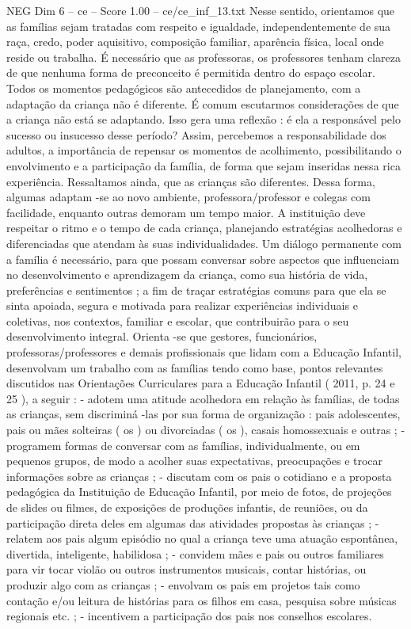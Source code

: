 \begin{textsample}{NEG Dim 6 – ce – Score 1.00 – ce/ce\_inf\_13.txt}
Nesse sentido, orientamos que as famílias sejam tratadas com respeito e igualdade, independentemente de sua raça, credo, poder aquisitivo, composição familiar, aparência física, local onde reside ou trabalha.
É necessário que as professoras, os professores tenham clareza de que nenhuma forma de preconceito é permitida dentro do espaço escolar.
Todos os momentos pedagógicos são antecedidos de planejamento, com a adaptação da criança não é diferente.
É comum escutarmos considerações de que a criança não está se adaptando.
Isso gera uma reflexão : é ela a responsável pelo sucesso ou insucesso desse período?
Assim, percebemos a responsabilidade dos adultos, a importância de repensar os momentos de acolhimento, possibilitando o envolvimento e a participação da família, de forma que sejam inseridas nessa rica experiência.
Ressaltamos ainda, que as crianças são diferentes.
Dessa forma, algumas adaptam -se ao novo ambiente, professora/professor e colegas com facilidade, enquanto outras demoram um tempo maior.
A instituição deve respeitar o ritmo e o tempo de cada criança, planejando estratégias acolhedoras e diferenciadas que atendam às suas individualidades.
Um diálogo permanente com a família é necessário, para que possam conversar sobre aspectos que influenciam no desenvolvimento e aprendizagem da criança, como sua história de vida, preferências e sentimentos ; a fim de traçar estratégias comuns para que ela se sinta apoiada, segura e motivada para realizar experiências individuais e coletivas, nos contextos, familiar e escolar, que contribuirão para o seu desenvolvimento integral.
Orienta -se que gestores, funcionários, professoras/professores e demais profissionais que lidam com a Educação Infantil, desenvolvam um trabalho com as famílias tendo como base, pontos relevantes discutidos nas Orientações Curriculares para a Educação Infantil ( 2011, p. 24 e 25 ), a seguir : - adotem uma atitude acolhedora em relação às famílias, de todas as crianças, sem discriminá -las por sua forma de organização : pais adolescentes, pais ou mães solteiras ( os ) ou divorciadas ( os ), casais homossexuais e outras ; - programem formas de conversar com as famílias, individualmente, ou em pequenos grupos, de modo a acolher suas expectativas, preocupações e trocar informações sobre as crianças ; - discutam com os pais o cotidiano e a proposta pedagógica da Instituição de Educação Infantil, por meio de fotos, de projeções de slides ou filmes, de exposições de produções infantis, de reuniões, ou da participação direta deles em algumas das atividades propostas às crianças ; - relatem aos pais algum episódio no qual a criança teve uma atuação espontânea, divertida, inteligente, habilidosa ; - convidem mães e pais ou outros familiares para vir tocar violão ou outros instrumentos musicais, contar histórias, ou produzir algo com as crianças ; - envolvam os pais em projetos tais como contação e/ou leitura de histórias para os filhos em casa, pesquisa sobre músicas regionais etc. ; - incentivem a participação dos pais nos conselhos escolares.

\end{textsample}

